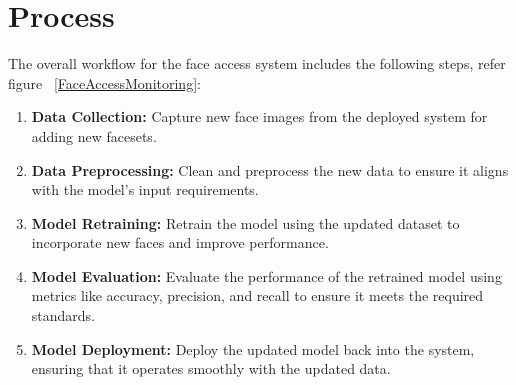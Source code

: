 \section{Process}

The overall workflow for the face access system includes the following steps, refer figure ~\ref{FaceAccessMonitoring}:

\begin{enumerate}
	\item \textbf{Data Collection:} Capture new face images from the deployed system for adding new facesets.
	\item \textbf{Data Preprocessing:} Clean and preprocess the new data to ensure it aligns with the model’s input requirements.
	\item \textbf{Model Retraining:} Retrain the model using the updated dataset to incorporate new faces and improve performance.
	\item \textbf{Model Evaluation:} Evaluate the performance of the retrained model using metrics like accuracy, precision, and recall to ensure it meets the required standards.
	\item \textbf{Model Deployment:} Deploy the updated model back into the system, ensuring that it operates smoothly with the updated data.
\end{enumerate}


